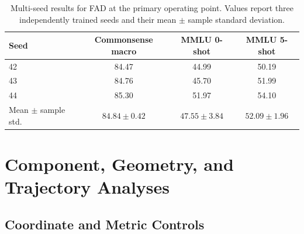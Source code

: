 \documentclass{article}
\theoremstyle{plain}
\theoremstyle{definition}
\theoremstyle{remark}
\begin{document}
\begin{table}[H]
\caption{Multi-seed results for FAD at the primary operating point. Values
report three independently trained seeds and their mean $\pm$ sample standard
deviation.}
\label{tab:app-seeds}
\centering
\small
\setlength{\tabcolsep}{8pt}
\begin{tabular}{@{}lccc@{}}
\toprule
\textbf{Seed} & \textbf{Commonsense macro}
& \textbf{MMLU 0-shot} & \textbf{MMLU 5-shot}\\
\midrule
42 & 84.47 & 44.99 & 50.19\\
43 & 84.76 & 45.70 & 51.99\\
44 & 85.30 & 51.97 & 54.10\\
\midrule
Mean $\pm$ sample std.
& $84.84\pm0.42$
& $47.55\pm3.84$
& $52.09\pm1.96$\\
\bottomrule
\end{tabular}
\end{table}


\FloatBarrier
\section{Component, Geometry, and Trajectory Analyses}
\label{app:geometry}

\subsection{Coordinate and Metric Controls}
\label{app:coordinate-controls}
\end{document}
